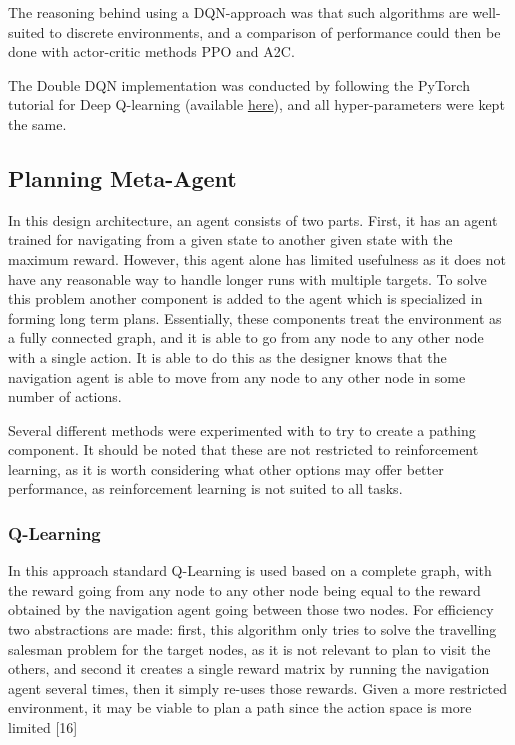 \documentclass{article}
\begin{document}
	The reasoning behind using a DQN-approach was that such algorithms are well-suited to discrete environments, and a comparison of performance could then be done with actor-critic methods PPO and A2C.
	
	The Double DQN implementation was conducted by following the PyTorch tutorial for Deep Q-learning (available \href{https://pytorch.org/tutorials/intermediate/reinforcement_q_learning.html}{here}), and all hyper-parameters were kept the same.
	
	\subsection{Planning Meta-Agent}
	\label{planning}
	In this design architecture, an agent consists of two parts. First, it has an agent trained for navigating from a given state to another given state with the maximum reward. However, this agent alone has limited usefulness as it does not have any reasonable way to handle longer runs with multiple targets. To solve this problem another component is added to the agent which is specialized in forming long term plans. Essentially, these components treat the environment as a fully connected graph, and it is able to go from any node to any other node with a single action. It is able to do this as the designer knows that the navigation agent is able to move from any node to any other node in some number of actions.
	
	Several different methods were experimented with to try to create a pathing component. It should be noted that these are not restricted to reinforcement learning, as it is worth considering what other options may offer better performance, as reinforcement learning is not suited to all tasks.
	
	\subsubsection{Q-Learning}
	In this approach standard Q-Learning is used based on a complete graph, with the reward going from any node to any other node being equal to the reward obtained by the navigation agent going between those two nodes. For efficiency two abstractions are made: first, this algorithm only tries to solve the travelling salesman problem for the target nodes, as it is not relevant to plan to visit the others, and second it creates a single reward matrix by running the navigation agent several times, then it simply re-uses those rewards. Given a more restricted environment, it may be viable to plan a path since the action space is more limited [16]
	
\end{document}
